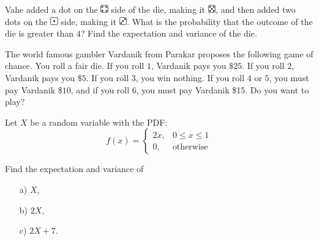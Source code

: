 
\begin{problem}
Vahe added a dot on the   \includegraphics[height=0.9em]{figs/4.png} side of the die, making it \includegraphics[height=0.9em]{figs/5.png}, and then added two dots on the \includegraphics[height=0.9em]{figs/1.png} side, making it \includegraphics[height=0.9em]{figs/3.png}.
What is the probability that the outcome of the die is greater than $4$? Find the expectation and variance of the die.
\end{problem}
\medskip

\begin{problem}
    The world famous gambler Vardanik from Parakar proposes the following game of chance. You roll a fair die. If you roll $1$,  Vardanik pays you $\$25$. If you roll  $2$, 
Vardanik pays you \$$5$. If you roll $3$, you win nothing. If you roll $4$ or $5$, you must 
pay Vardanik \$$10$, and if you roll $6$, you must pay Vardanik \$15. Do you want to play? 
\end{problem}


\medskip 




\begin{problem}
Let $X$ be a random variable with the PDF:
\[
f(x) = \begin{cases}
   2x, & 0 \le x \le 1 \\
   0, & \text{otherwise}
\end{cases}
\]

Find the expectation and variance of
\begin{enumerate}
   \item[a) ] $X$,
   \item[b) ] $2X$,
   \item[c) ] $2X + 7$. 
   
\end{enumerate}
\end{problem}
\medskip



